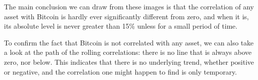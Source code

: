 The main conclusion we can draw from these images is that the correlation of any asset with Bitcoin is hardly ever significantly different from zero, and when it is, its absolute level is never greater than 15\%  unless for a small period of time.

To confirm the fact that Bitcoin is not correlated with any asset, we can also take a look at the path of the rolling correlations: there is no line that is always above zero, nor below. This indicates that there is no underlying trend, whether positive or negative, and the correlation one might happen to find is only temporary.





